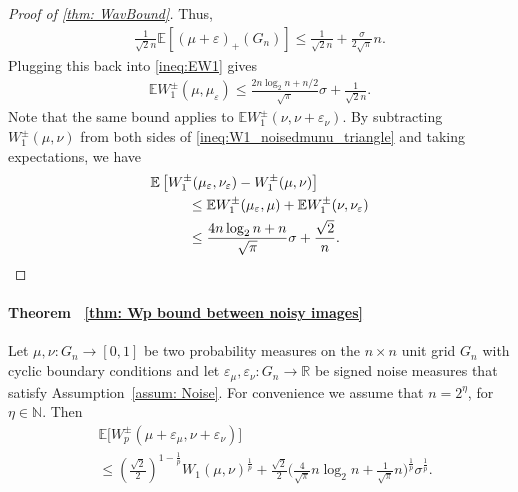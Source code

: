 \documentclass{article}
\theoremstyle{plain}
\theoremstyle{definition}
\theoremstyle{remark}
\begin{document}
\begin{proof}[Proof of \cref{thm: WavBound}]
Thus,
\begin{align}
    \frac{1}{\sqrt{2} n} \mathbb{E} \left[ (\mu + \varepsilon)_+ (G_n) \right]
    \le
    \frac{1}{\sqrt{2} n}
    +
    \frac{ \sigma }{2\sqrt{\pi}} n.
\end{align}
Plugging this back into \eqref{ineq:EW1} gives
\begin{align}
    \mathbb{E} W_1^\pm \left( \mu, \mu_\varepsilon \right)
    \le
    \frac{2n \log_2 n + n/2 }{\sqrt{\pi}} \sigma
    +
    \frac{1}{\sqrt{2} n}.
\end{align}
Note that the same bound applies to \( \mathbb{E} W_1^\pm \left( \nu, \nu + \varepsilon_\nu \right) \).
By subtracting \( W_1^\pm(\mu, \nu) \) from both sides of \eqref{ineq:W1_noisedmunu_triangle} and taking expectations, we have
\begin{align}
    \mathbb{E} &\left[ W_1^\pm(\mu_\varepsilon,  \nu_\varepsilon) - W_1^\pm(\mu, \nu) \right]
    \\
    &\qquad\le
    \mathbb{E} W_1^\pm(\mu_\varepsilon, \mu)
    +
    \mathbb{E} W_1^\pm(\nu, \nu_\varepsilon) \nonumber
    \\
    &\qquad\le
    \frac{4n \log_2 n + n }{\sqrt{\pi}} \sigma
    +
    \frac{\sqrt{2}}{n}. \qedhere
\end{align}
\end{proof}


\paragraph{Theorem ~\ref{thm: Wp bound between noisy images}}
    Let $\mu, \nu:G_n \to [0,1]$ be two probability measures on the \(n \times n\) unit grid $G_n$ with cyclic boundary conditions and let
    \( \varepsilon_\mu, \varepsilon_\nu : G_n \to \mathbb{R} \) be signed noise measures that satisfy Assumption~\ref{assum: Noise}.
    For convenience we assume that $n=2^\eta$, for $\eta \in \mathbb{N}$.
    Then 
    \begin{align}
        &\mathbb{E}\big[W_p^\pm(\mu+\varepsilon_\mu,\nu+\varepsilon_\nu)\big]
        \\
        &\le
        \left(\tfrac{\sqrt2}{2}\right)^{1-\frac1p} W_1(\mu,\nu)^{\tfrac1p} 
        + 
        \tfrac{\sqrt2}{2}\bigg(\tfrac{4}{\sqrt{\pi}} n\log_2 n +
        \tfrac{1}{\sqrt\pi} n 
        \bigg)^{\tfrac1p}\sigma^{\tfrac1p}. \nonumber
    \end{align}
\end{document}
